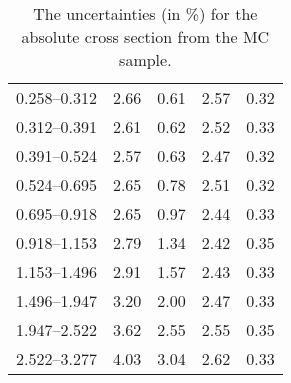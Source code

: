 \begin{table}
\begin{center}
\begin{tabular}{@{}l l l l l@{}}
            0.258--0.312 & 2.66 & 0.61 & 2.57 & 0.32  \\
            0.312--0.391 & 2.61 & 0.62 & 2.52 & 0.33  \\
            0.391--0.524 & 2.57 & 0.63 & 2.47 & 0.32  \\
            0.524--0.695 & 2.65 & 0.78 & 2.51 & 0.32  \\
            0.695--0.918 & 2.65 & 0.97 & 2.44 & 0.33  \\
            0.918--1.153 & 2.79 & 1.34 & 2.42 & 0.35  \\
            1.153--1.496 & 2.91 & 1.57 & 2.43 & 0.33  \\
            1.496--1.947 & 3.20 & 2.00 & 2.47 & 0.33  \\
            1.947--2.522 & 3.62 & 2.55 & 2.55 & 0.35  \\
            2.522--3.277 & 4.03 & 3.04 & 2.62 & 0.33  \\
            \bottomrule
        \end{tabular}
    \end{center}
    \caption[
        The uncertainties for the absolute cross section from the \POWHEG MC
        sample.
    ]{
        The uncertainties (in \%) for the absolute cross section from the
        \POWHEG MC sample.
    }
    \label{tab:powheg_uncert_abs}
\end{table}

